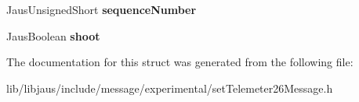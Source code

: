 \begin{DoxyCompactItemize}
\item 
\hypertarget{struct_set_telemeter26_message_struct_a943cbd33c5e7c9b0449ad45b7de386cb}{\-Jaus\-Unsigned\-Short {\bfseries sequence\-Number}}\label{struct_set_telemeter26_message_struct_a943cbd33c5e7c9b0449ad45b7de386cb}

\item 
\hypertarget{struct_set_telemeter26_message_struct_afa2258e4eb38a8c3942e34ccb8149242}{\-Jaus\-Boolean {\bfseries shoot}}\label{struct_set_telemeter26_message_struct_afa2258e4eb38a8c3942e34ccb8149242}

\end{DoxyCompactItemize}


\-The documentation for this struct was generated from the following file\-:\begin{DoxyCompactItemize}
\item 
lib/libjaus/include/message/experimental/set\-Telemeter26\-Message.\-h\end{DoxyCompactItemize}
